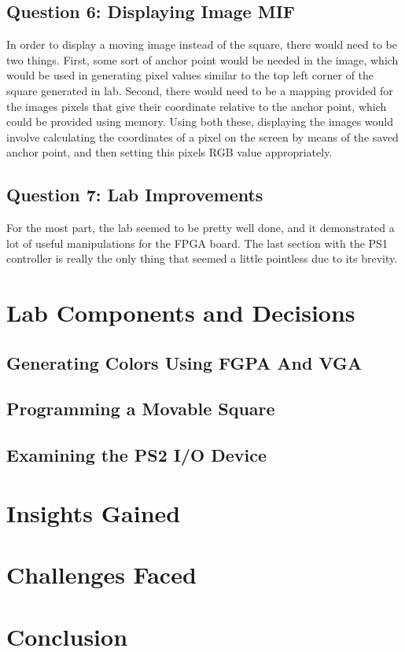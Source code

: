 \documentclass[letterpaper]{article} %
\begin{document}
    \subsection{Question 6: Displaying Image MIF}
        In order to display a moving image instead of the square, there would need to be two things. First, some sort of anchor point would be needed in the image, which would be used in generating pixel values similar to the top left corner of the square generated in lab. Second, there would need to be a mapping provided for the images pixels that give their coordinate relative to the anchor point, which could be provided using memory. Using both these, displaying the images would involve calculating the coordinates of a pixel on the screen by means of the saved anchor point, and then setting this pixels RGB value appropriately.
        
    \subsection{Question 7: Lab Improvements}
        For the most part, the lab seemed to be pretty well done, and it demonstrated a lot of useful manipulations for the FPGA board. The last section with the PS1 controller is really the only thing that seemed a little pointless due to its brevity.
\section{Lab Components and Decisions}
    \subsection{Generating Colors Using FGPA And VGA}

    \subsection{Programming a Movable Square}

    \subsection{Examining the PS2 I/O Device}

\section{Insights Gained}

\section{Challenges Faced}

\section{Conclusion}
\end{document}
